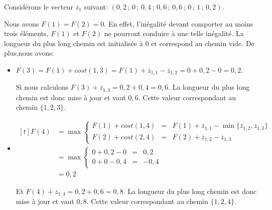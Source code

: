 \begin{ex}
Considérons le vecteur $\overline{z}_1$ suivant: $(0,2\, ;\, 0\, ;\,
0,4\, ;\, 0,6\, ;\, 0,6\, ;\, 0\, ;\, 1\, ;\, 0,2)$.

Nous avons $F(1)=F(2)=0$. En effet, l'inégalité devant comporter au moins
trois éléments, $F(1)$ et $F(2)$ ne pourront conduire à une telle
inégalité. La longueur du plus long chemin est initialisée à $0$ et
correspond au chemin vide. De plus,nous avons: 
\begin{itemize}
\item $F(3) =  F(1) + cost (1,3) = F(1) + \overline{z}_{1,1} -
  \overline{z}_{1,2} = 0 + 0,2 - 0= 0,2 $. 
  
  Si nous calculons $F(3)+\overline{z}_{1,3}=0,2+0,4=0,6$. La
  longueur du plus long chemin est donc mise à jour et vaut
  $0,6$. Cette valeur correspondant au chemin $\{1,2,3\}$.
\item $\begin{aligned}[t] 
    F(4) &=  \max \left\{
        \begin{array}{lcl}
          F(1) + cost (1,4) & = & F(1) + \overline{z}_{1,1}  -
                              \min\{\overline{z}_{1,2},\overline{z}_{1,3}\}  \\
          F(2) + cost (2,4) &= & F(2) + \overline{z}_{1,2} -
                              \overline{z}_{1,3}     
        \end{array} \right.\\
    &=  \max \left\{ 
        \begin{array}{lcl}
          0 + 0,2 - 0 &=& 0,2\\
          0 + 0 - 0,4 &= &-0,4 
        \end{array} \right.\\
    &=  0,2
  \end{aligned}$

  Et $F(4)+\overline{z}_{1,4}=0,2+0,6=0,8$. La
  longueur du plus long chemin est donc mise à jour et vaut
  $0,8$. Cette valeur correspondant au chemin $\{1,2,4\}$.


\end{itemize}
\end{ex}
